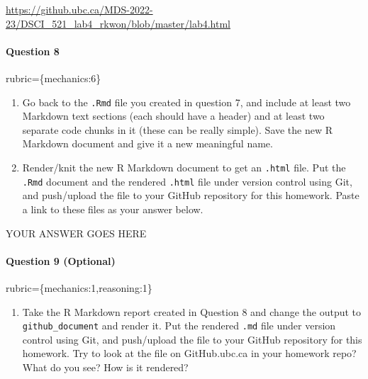 \documentclass[
]{article}
\providecommand{\tightlist}{%
  \setlength{\itemsep}{0pt}\setlength{\parskip}{0pt}}
\begin{document}
\url{https://github.ubc.ca/MDS-2022-23/DSCI_521_lab4_rkwon/blob/master/lab4.html}

\begin{alert alert-info}
\hypertarget{question-8}{%
\paragraph{Question 8}\label{question-8}}

rubric=\{mechanics:6\}

\begin{enumerate}
\def\labelenumi{\arabic{enumi}.}
\item
  Go back to the \texttt{.Rmd} file you created in question 7, and
  include at least two Markdown text sections (each should have a
  header) and at least two separate code chunks in it (these can be
  really simple). Save the new R Markdown document and give it a new
  meaningful name.
\item
  Render/knit the new R Markdown document to get an \texttt{.html} file.
  Put the \texttt{.Rmd} document and the rendered \texttt{.html} file
  under version control using Git, and push/upload the file to your
  GitHub repository for this homework. Paste a link to these files as
  your answer below.
\end{enumerate}
\end{alert alert-info}

YOUR ANSWER GOES HERE

\begin{alert alert-info}
\hypertarget{question-9-optional}{%
\paragraph{Question 9 (Optional)}\label{question-9-optional}}

rubric=\{mechanics:1,reasoning:1\}

\begin{enumerate}
\def\labelenumi{\arabic{enumi}.}
\tightlist
\item
  Take the R Markdown report created in Question 8 and change the output
  to \texttt{github\_document} and render it. Put the rendered
  \texttt{.md} file under version control using Git, and push/upload the
  file to your GitHub repository for this homework. Try to look at the
  file on GitHub.ubc.ca in your homework repo? What do you see? How is
  it rendered?
\end{enumerate}
\end{alert alert-info}
\end{document}
